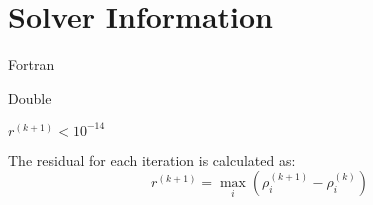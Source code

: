 \documentclass{SelimArticle}
\begin{document}
\mytitlepage
\newpage
\newcommand{\pexit}{\ensuremath{p_{\mathrm{exit}}}}
\section*{Solver Information}
\begin{description}[noitemsep]
    \item[Programming Language:] Fortran
    \item[Precision:] Double
    \item[Convergence Criteria:] $r^{(k+1)} < 10^{-14}$
\end{description}

The residual for each iteration is calculated as:
$$
r^{(k+1)} = \max_i \left( \rho^{(k+1)}_i - \rho^{(k)}_i \right)
$$

\newpage

\newpage

\newpage

\newpage

\newpage

\end{document}
